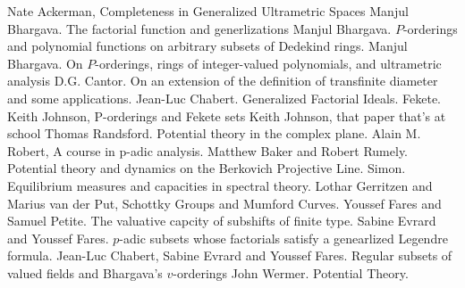 \documentclass[12pt]{dalthesis}
\theoremstyle{plain}
\theoremstyle{definition}
\begin{document}
\begin{thebibliography}{9}
 Nate Ackerman,  Completeness in Generalized Ultrametric Spaces
 Manjul Bhargava. The factorial function and generlizations
 Manjul Bhargava. $P$-orderings and polynomial functions on arbitrary subsets of Dedekind rings.
 Manjul Bhargava. On $ P$-orderings, rings of integer-valued polynomials, and ultrametric analysis
  D.G. Cantor. On an extension of the definition of transfinite diameter and some applications.  
 Jean-Luc Chabert. Generalized Factorial Ideals.
 Fekete.
 Keith Johnson, P-orderings and Fekete sets
 Keith Johnson, that paper that's at school
 Thomas Randsford. Potential theory in the complex plane.
 Alain M. Robert, A course in p-adic analysis.
 Matthew Baker and Robert Rumely. Potential theory and dynamics on the Berkovich Projective Line.
 Simon. Equilibrium measures and capacities in spectral theory.
 Lothar Gerritzen and Marius van der Put, Schottky Groups and Mumford Curves.
 Youssef Fares and Samuel Petite. The valuative capcity of subshifts of finite type.
 Sabine Evrard and Youssef Fares. $p$-adic subsets whose factorials satisfy a genearlized Legendre formula.
 Jean-Luc Chabert, Sabine Evrard and Youssef Fares. Regular subsets of valued fields and Bhargava’s $v$-orderings
 John Wermer. Potential Theory.
\end{thebibliography}
\end{document}
